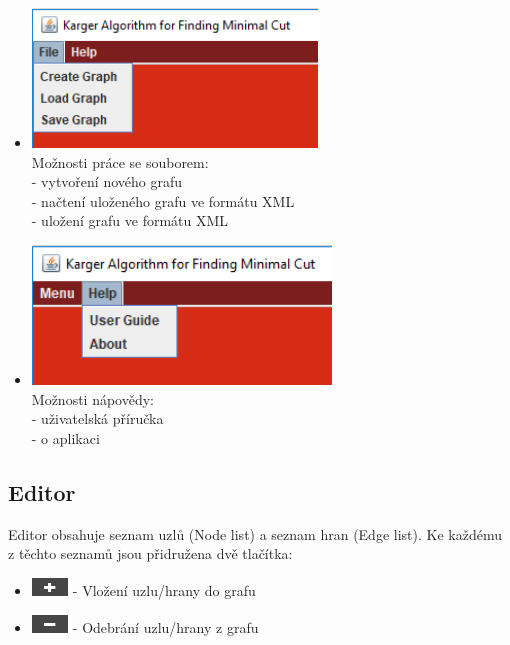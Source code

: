\documentclass[../projekt.tex]{subfiles}
\begin{document}
\begin{itemize}
    \item \includegraphics[height=10em]{obrazky-figures/file.png} \\Možnosti práce se souborem: \\ - vytvoření nového grafu \\ - načtení uloženého grafu ve formátu XML \\ - uložení grafu ve formátu XML
    \item \includegraphics[height=10em]{obrazky-figures/help.png} \\Možnosti nápovědy: \\ - uživatelská příručka \\ - o aplikaci \\
\end{itemize}



\subsection{Editor}

Editor obsahuje seznam uzlů (Node list) a seznam hran (Edge list). Ke každému z těchto seznamů jsou přidružena dvě tlačítka: 

\begin{itemize}
    \item \includegraphics[height=1.3em]{obrazky-figures/addButton.png} - Vložení uzlu/hrany do grafu
    \item \includegraphics[height=1.3em]{obrazky-figures/removeButton.png} - Odebrání uzlu/hrany z grafu \\
\end{itemize} 
\end{document}
